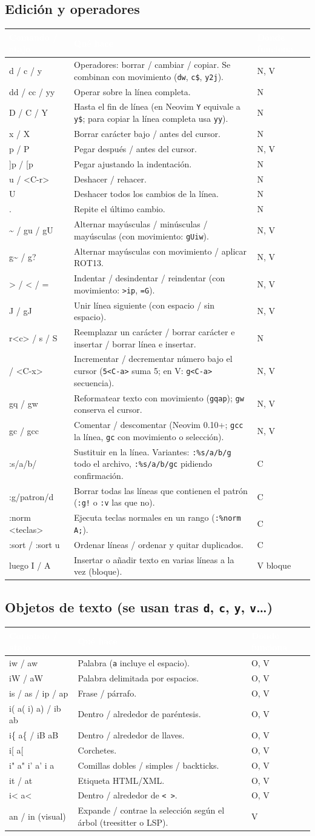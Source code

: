 \documentclass[8pt,a4paper,landscape]{extarticle}
\newcommand{\kk}[1]{\texttt{#1}}
\newcommand{\bt}{\textasciigrave{}}
\newenvironment{cht}{%
  \begin{longtable}{>{\raggedright\arraybackslash\ttfamily}p{0.27\textwidth}
                    >{\raggedright\arraybackslash}p{0.46\textwidth}
                    >{\raggedright\arraybackslash}p{0.21\textwidth}}
  \rowcolor{accent}\textcolor{white}{\textbf{\rmfamily Comando / atajo}} &
  \textcolor{white}{\textbf{Qué hace}} & \textcolor{white}{\textbf{Dónde funciona}} \\
  \endhead
}{\end{longtable}}
\newcommand{\rr}[3]{#1 & #2 & #3 \\}
\newcommand{\rg}[3]{\rowcolor{rowgray}\relax #1 & #2 & #3 \\}
\let\oldsubsection\subsection
\renewcommand{\subsection}{\Needspace{9\baselineskip}\oldsubsection}
\begin{document}
\subsection{Edición y operadores}
\begin{cht}
\rg{d / c / y}{Operadores: borrar / cambiar / copiar. Se combinan con movimiento (\kk{dw}, \kk{c\$}, \kk{y2j}).}{N, V}
\rr{dd / cc / yy}{Operar sobre la línea completa.}{N}
\rg{D / C / Y}{Hasta el fin de línea (en Neovim \kk{Y} equivale a \kk{y\$}; para copiar la línea completa usa \kk{yy}).}{N}
\rr{x / X}{Borrar carácter bajo / antes del cursor.}{N}
\rg{p / P}{Pegar después / antes del cursor.}{N, V}
\rr{]p / [p}{Pegar ajustando la indentación.}{N}
\rg{u / <C-r>}{Deshacer / rehacer.}{N}
\rr{U}{Deshacer todos los cambios de la línea.}{N}
\rg{.}{Repite el último cambio.}{N}
\rr{\~{} / gu / gU}{Alternar mayúsculas / minúsculas / mayúsculas (con movimiento: \kk{gUiw}).}{N, V}
\rg{g\~{} / g?}{Alternar mayúsculas con movimiento / aplicar ROT13.}{N, V}
\rr{> / < / =}{Indentar / desindentar / reindentar (con movimiento: \kk{>ip}, \kk{=G}).}{N, V}
\rg{J / gJ}{Unir línea siguiente (con espacio / sin espacio).}{N, V}
\rr{r<c> / s / S}{Reemplazar un carácter / borrar carácter e insertar / borrar línea e insertar.}{N}
\rg{<C-a> / <C-x>}{Incrementar / decrementar número bajo el cursor (\kk{5<C-a>} suma 5; en V: \kk{g<C-a>} secuencia).}{N, V}
\rr{gq / gw}{Reformatear texto con movimiento (\kk{gqap}); \kk{gw} conserva el cursor.}{N, V}
\rg{gc / gcc}{Comentar / descomentar (Neovim 0.10+; \kk{gcc} la línea, \kk{gc} con movimiento o selección).}{N, V}
\rr{:s/a/b/}{Sustituir en la línea. Variantes: \kk{:\%s/a/b/g} todo el archivo, \kk{:\%s/a/b/gc} pidiendo confirmación.}{C}
\rg{:g/patron/d}{Borrar todas las líneas que contienen el patrón (\kk{:g!} o \kk{:v} las que no).}{C}
\rr{:norm <teclas>}{Ejecuta teclas normales en un rango (\kk{:\%norm A;}).}{C}
\rg{:sort / :sort u}{Ordenar líneas / ordenar y quitar duplicados.}{C}
\rr{<C-v> luego I / A}{Insertar o añadir texto en varias líneas a la vez (bloque).}{V bloque}
\end{cht}

\subsection{Objetos de texto (se usan tras \kk{d}, \kk{c}, \kk{y}, \kk{v}\ldots)}
\begin{cht}
\rg{iw / aw}{Palabra (\kk{a} incluye el espacio).}{O, V}
\rr{iW / aW}{Palabra delimitada por espacios.}{O, V}
\rg{is / as / ip / ap}{Frase / párrafo.}{O, V}
\rr{i( a( i) a) / ib ab}{Dentro / alrededor de paréntesis.}{O, V}
\rg{i\{ a\{ / iB aB}{Dentro / alrededor de llaves.}{O, V}
\rr{i[ a[}{Corchetes.}{O, V}
\rg{i" a" i' a' i\bt{} a\bt{}}{Comillas dobles / simples / backticks.}{O, V}
\rr{it / at}{Etiqueta HTML/XML.}{O, V}
\rg{i< a<}{Dentro / alrededor de \kk{< >}.}{O, V}
\rr{an / in (visual)}{Expande / contrae la selección según el árbol (treesitter o LSP).}{V}
\end{cht}
\end{document}

